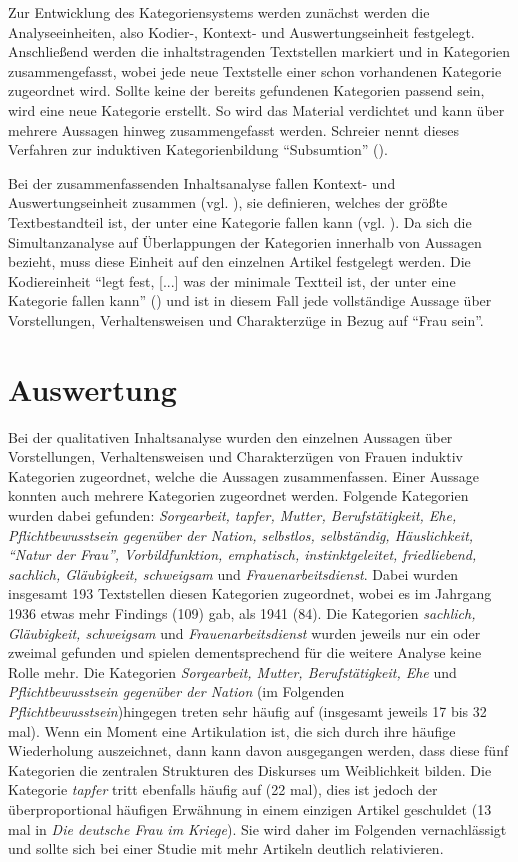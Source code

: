 \documentclass[12pt, titlepage=true, toc=bib]{scrartcl}
\begin{document}
Zur Entwicklung des Kategoriensystems werden zunächst werden die Analyseeinheiten, also Kodier-, Kontext- und Auswertungseinheit festgelegt. Anschließend werden die inhaltstragenden Textstellen markiert und in Kategorien zusammengefasst, wobei jede neue Textstelle einer schon vorhandenen Kategorie zugeordnet wird. Sollte keine der bereits gefundenen Kategorien passend sein, wird eine neue Kategorie erstellt. So wird das Material verdichtet und kann über mehrere Aussagen hinweg zusammengefasst werden. Schreier nennt dieses Verfahren zur induktiven Kategorienbildung "`Subsumtion"' (\cite[7]{schreier_varianten_2014}).

Bei der zusammenfassenden Inhaltsanalyse fallen Kontext- und Auswertungseinheit zusammen (vgl. \cite[71]{mayring_qualitative_2010}), sie definieren, welches der größte Textbestandteil ist, der unter eine Kategorie fallen kann (vgl. \cite[59]{mayring_qualitative_2010}). Da sich die Simultanzanalyse auf Überlappungen der Kategorien innerhalb von Aussagen bezieht, muss diese Einheit auf den einzelnen Artikel festgelegt werden. Die Kodiereinheit "`legt fest, [...] was der minimale Textteil ist, der unter eine Kategorie fallen kann"' (\cite[59]{mayring_qualitative_2010}) und ist in diesem Fall jede vollständige Aussage über Vorstellungen, Verhaltensweisen und Charakterzüge in Bezug auf "`Frau sein"'.

\section{Auswertung}

Bei der qualitativen Inhaltsanalyse wurden den einzelnen Aussagen über Vorstellungen, Verhaltensweisen und Charakterzügen von Frauen induktiv Kategorien zugeordnet, welche die Aussagen zusammenfassen. Einer Aussage konnten auch mehrere Kategorien zugeordnet werden. Folgende Kategorien wurden dabei gefunden: \textit{Sorgearbeit, tapfer, Mutter, Berufstätigkeit, Ehe, Pflichtbewusstsein gegenüber der Nation, selbstlos, selbständig, Häuslichkeit, "`Natur der Frau"', Vorbildfunktion, emphatisch, instinktgeleitet, friedliebend, sachlich, Gläubigkeit, schweigsam} und \textit{Frauenarbeitsdienst}. Dabei wurden insgesamt 193 Textstellen diesen Kategorien zugeordnet, wobei es im Jahrgang 1936 etwas mehr Findings (109) gab, als 1941 (84). Die Kategorien \textit{sachlich, Gläubigkeit, schweigsam} und \textit{Frauenarbeitsdienst} wurden jeweils nur ein oder zweimal gefunden und spielen dementsprechend für die weitere Analyse keine Rolle mehr. Die Kategorien \textit{Sorgearbeit, Mutter, Berufstätigkeit, Ehe} und \textit{Pflichtbewusstsein gegenüber der Nation} (im Folgenden \textit{Pflichtbewusstsein})hingegen treten sehr häufig auf (insgesamt jeweils 17 bis 32 mal). Wenn ein Moment eine Artikulation ist, die sich durch ihre häufige Wiederholung auszeichnet, dann kann davon ausgegangen werden, dass diese fünf Kategorien die zentralen Strukturen des Diskurses um Weiblichkeit bilden. Die Kategorie \textit{tapfer} tritt ebenfalls häufig auf (22 mal), dies ist jedoch der überproportional häufigen Erwähnung in einem einzigen Artikel geschuldet (13 mal in \textit{Die deutsche Frau im Kriege}). Sie wird daher im Folgenden vernachlässigt und sollte sich bei einer Studie mit mehr Artikeln deutlich relativieren.
\end{document}
